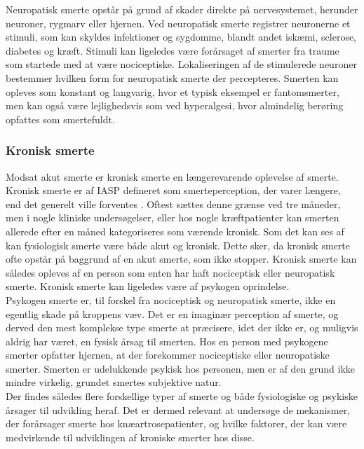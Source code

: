 Neuropatisk smerte opstår på grund af skader direkte på nervesystemet, herunder neuroner, rygmarv eller hjernen. Ved neuropatisk smerte registrer neuronerne et stimuli, som kan skyldes infektioner og sygdomme, blandt andet iskæmi, sclerose, diabetes og kræft. Stimuli kan ligeledes være forårsaget af smerter fra traume som startede med at være nociceptiske. Lokaliseringen af de stimulerede neuroner bestemmer hvilken form for neuropatisk smerte der percepteres. Smerten kan opleves som konstant og langvarig, hvor et typisk eksempel er fantomsmerter, men kan også være lejlighedsvis som ved hyperalgesi, hvor almindelig berøring opfattes som smertefuldt. \citep{Carmon} \citep{Giangregorio1997}

\subsubsection{Kronisk smerte}
Modsat akut smerte er kronisk smerte en længerevarende oplevelse af smerte. Kronisk smerte er af IASP defineret som smerteperception, der varer længere, end det generelt ville forventes \citep{Carmon}. Oftest sættes denne grænse ved tre måneder, men i nogle kliniske undersøgelser, eller hos nogle kræftpatienter kan smerten allerede efter en måned kategoriseres som værende kronisk. Som det kan ses af  kan fysiologisk smerte være både akut og kronisk. Dette sker, da kronisk smerte ofte opstår på baggrund af en akut smerte, som ikke stopper. Kronisk smerte kan således opleves af en person som enten har haft nociceptisk eller neuropatisk smerte. Kronisk smerte kan ligeledes være af psykogen oprindelse. \citep{Giangregorio1997}\\
Psykogen smerte er, til forskel fra nociceptisk og neuropatisk smerte, ikke en egentlig skade på kroppens væv. Det er en imaginær perception af smerte, og derved den mest komplekse type smerte at præcisere, idet der ikke er, og muligvis aldrig har været, en fysisk årsag til smerten. Hos en person med psykogene smerter opfatter hjernen, at der forekommer nociceptiske eller neuropatiske smerter. Smerten er udelukkende psykisk hos personen, men er af den grund ikke mindre virkelig, grundet smertes subjektive natur. \citep{Giangregorio1997} \\
Der findes således flere forskellige typer af smerte og både fysiologiske og psykiske årsager til udvikling heraf. Det er dermed relevant at undersøge de mekanismer, der forårsager smerte hos knæartrosepatienter, og hvilke faktorer, der kan være medvirkende til udviklingen af kroniske smerter hos disse.  

